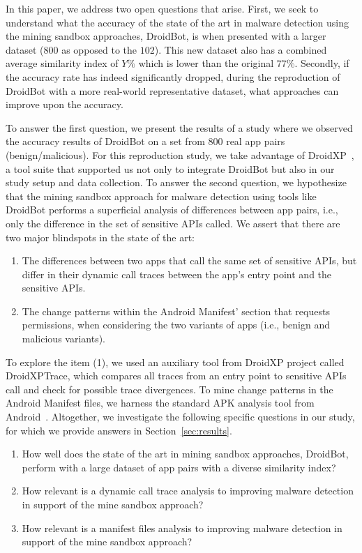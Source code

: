 In this paper, we address two open questions that arise. First, we seek to understand what the accuracy of the state of the art in malware detection using the mining sandbox approaches, DroidBot, is when presented with a larger dataset ($800$ as opposed to the $102$). This new dataset also has a combined average similarity index of $Y\%$ which is lower than the original $77\%$. Secondly, if the accuracy rate has indeed significantly dropped, during the reproduction of DroidBot with a more real-world representative dataset, what approaches can improve upon the accuracy. 

To answer the first question, we present the results of a study where we observed the accuracy results of DroidBot on a set from $800$ real app pairs (benign/malicious). For this reproduction study, we take advantage of DroidXP~\cite{DBLP:conf/scam/CostaMCMVBC20}, a tool suite that supported us not only to integrate DroidBot but also in our study setup and data collection. To answer the second question, we hypothesize that the mining sandbox approach for malware detection using tools like DroidBot performs a superficial analysis of differences between app pairs, i.e., only the difference in the set of sensitive APIs called. We assert that there are two major blindspots in the state of the art:

\begin{enumerate}
    \item The differences between two apps that call the same set of sensitive APIs, but differ in their dynamic call traces between the app's entry point and the sensitive APIs.
    \item The {\color{blue}change patterns} within the Android Manifest' section that requests permissions, when considering the two variants of apps (i.e., benign and malicious variants).
\end{enumerate}

To explore the item (1), we used an auxiliary tool from DroidXP project called DroidXPTrace, which compares all traces from an entry point to sensitive APIs call and check for possible trace divergences. To {\color{blue}mine change patterns} in the Android Manifest files, we harness the standard APK analysis tool from Android~\cite{au2011short}. Altogether, we investigate the following specific questions in our study, for which we provide answers in Section~\ref{sec:results}.


\begin{enumerate}[(RQ1)]
 \item How well does the state of the art in mining sandbox approaches, DroidBot, perform with a large dataset of app pairs with a diverse similarity index?
 \item How relevant is a dynamic call trace analysis to improving malware detection in support of the mine sandbox approach?
 \item How relevant is a manifest files analysis to improving malware detection in support of the mine sandbox approach?
\end{enumerate}
 

